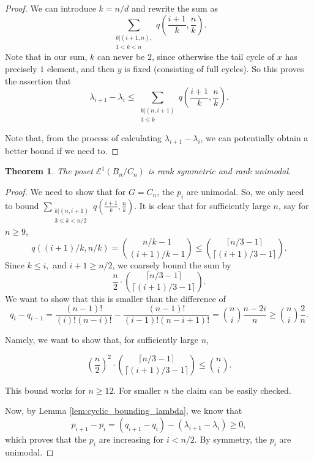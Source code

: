 \documentclass[10 pt]{amsart}
\theoremstyle{plain}
\newtheorem{thm}{Theorem}[section]
\theoremstyle{definition}
\theoremstyle{remark}
\numberwithin{equation}{section}
\newcommand{\dstyle}{\displaystyle}
\begin{document}
\begin{proof}
We can introduce $k = n/d$  and rewrite the sum as 
$$\sum_{\substack{k | (i+1, n), \\ 1 < k < n}} q\left(\frac{i+1}{k}, \frac{n}{k}\right).$$ Note that in our sum, $k$ can never be $2$, since otherwise the tail cycle of $x$  has precisely $1$ element, and then $y$ is fixed (consisting of full cycles). So this proves the assertion that $$\lambda_{i+1} - \lambda_i \le \sum_{\substack{k | (n , i+1) \\ 3 \le k }} q (\frac{i+1}{k}, \frac{n}{k}). $$ 
 
Note that, from the process of calculating $\lambda_{i+1} - \lambda_{i}$, we can potentially obtain a better bound if we need to. 
\end{proof}


\begin{thm}{\label{cor:cyclic_unimodal}} 
The poset $\mathcal E^1(B_n/C_n)$ is rank symmetric and rank unimodal.
\end{thm}

\begin{proof}

We need to show that for $G= C_n$, the $p_i$ are unimodal. So, we only need to bound $ \dstyle \sum_{\substack{k | (n , i+1)\\ 3 \le k < n/2 }} q (\frac{i+1}{k}, \frac{n}{k}) $. It is clear that for sufficiently large $n$, say for $n \ge 9$, $$q((i+1)/k, n/k) = {n/k - 1 \choose (i+1)/k -1} \le {\lceil n/3-1 \rceil \choose \lceil (i+1)/3 -1 \rceil }.$$ Since $k \leq i,$ and $ i+1 \ge n/2$, we coarsely bound the sum by $$\frac{n}{2} \cdot {\lceil n/3-1 \rceil \choose \lceil (i+1)/3 -1 \rceil }. $$ We want to show that this is smaller than the difference of $$q_i - q_{i-1} = \frac{(n-1)!}{(i)! (n-i)!} - \frac{(n-1)!}{(i-1)!(n-i+1)!}= {n \choose i } \frac{n-2i}{n} \ge  {n \choose i } \frac{2}{n} .$$

Namely, we want to show that, for sufficiently large $n$, 

$$ \left(\frac{n}{2}\right)^2 \cdot {\lceil n/3-1 \rceil \choose \lceil (i+1)/3 -1 \rceil }  \le   {n \choose i}.$$

This bound works for $n \ge 12$. For smaller $n$ the claim can be easily checked. 

Now, by Lemma \ref{lem:cyclic_bounding_lambda}, we know that $$p_{i+1} - p_{i} =  (q_{i+1} - q_i) - (\lambda_{i+1}- \lambda_i) \ge 0,$$  which proves that the $p_i$ are increasing for $i < n/2$. By symmetry, the $p_i$ are unimodal.

\end{proof}
\end{document}
